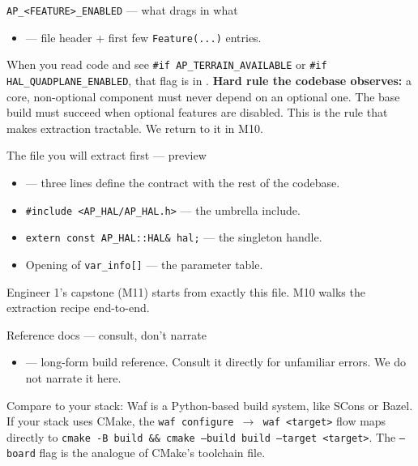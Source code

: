 \documentclass[aspectratio=169,11pt]{beamer}
\begin{document}
\begin{frame}{\texttt{AP\_<FEATURE>\_ENABLED} --- what drags in what}
  \begin{itemize}
    \item {} --- file header + first few \texttt{Feature(...)} entries.
  \end{itemize}
  \vfill
  When you read code and see \texttt{\#if AP\_TERRAIN\_AVAILABLE} or \texttt{\#if HAL\_QUADPLANE\_ENABLED}, that flag is in .
  \vfill
  \textbf{Hard rule the codebase observes:} a core, non-optional component must never depend on an optional one. The base build must succeed when optional features are disabled.
  \vfill
  This is the rule that makes extraction tractable. We return to it in M10.
\end{frame}

\begin{frame}{The file you will extract first --- preview}
  \begin{itemize}
    \item {} --- three lines define the contract with the rest of the codebase.
  \end{itemize}
  \vfill
  \begin{itemize}
    \item \texttt{\#include <AP\_HAL/AP\_HAL.h>} --- the umbrella include.
    \item \texttt{extern const AP\_HAL::HAL\& hal;} --- the singleton handle.
    \item Opening of \texttt{var\_info[]} --- the parameter table.
  \end{itemize}
  \vfill
  Engineer 1's capstone (M11) starts from exactly this file. M10 walks the extraction recipe end-to-end.
\end{frame}

\begin{frame}{Reference docs --- consult, don't narrate}
  \begin{itemize}
    \item {} --- long-form build reference. Consult it directly for unfamiliar errors. We do not narrate it here.
  \end{itemize}
  \vfill
  Compare to your stack: Waf is a Python-based build system, like SCons or Bazel. If your stack uses CMake, the \texttt{waf configure $\rightarrow$ waf <target>} flow maps directly to \texttt{cmake -B build \&\& cmake --build build --target <target>}. The \texttt{--board} flag is the analogue of CMake's toolchain file.
\end{frame}
\end{document}
